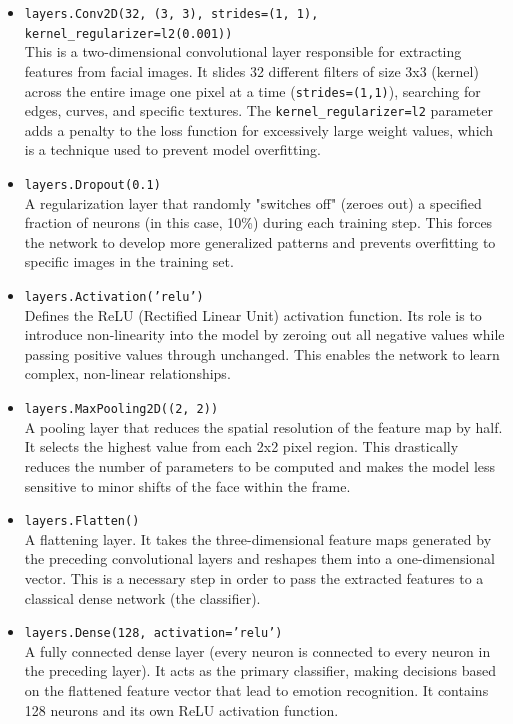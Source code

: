 \documentclass{article}
\begin{document}
\begin{itemize}
    \item \texttt{layers.Conv2D(32, (3, 3), strides=(1, 1), kernel\_regularizer=l2(0.001))} \\
    This is a two-dimensional convolutional layer responsible for extracting features from facial images. It slides 32 different filters of size 3x3 (kernel) across the entire image one pixel at a time (\texttt{strides=(1,1)}), searching for edges, curves, and specific textures. The \texttt{kernel\_regularizer=l2} parameter adds a penalty to the loss function for excessively large weight values, which is a technique used to prevent model overfitting.
    
    \item \texttt{layers.Dropout(0.1)} \\
    A regularization layer that randomly "switches off" (zeroes out) a specified fraction of neurons (in this case, 10\%) during each training step. This forces the network to develop more generalized patterns and prevents overfitting to specific images in the training set.
    
    \item \texttt{layers.Activation('relu')} \\
    Defines the ReLU (Rectified Linear Unit) activation function. Its role is to introduce non-linearity into the model by zeroing out all negative values while passing positive values through unchanged. This enables the network to learn complex, non-linear relationships.
    
    \item \texttt{layers.MaxPooling2D((2, 2))} \\
    A pooling layer that reduces the spatial resolution of the feature map by half. It selects the highest value from each 2x2 pixel region. This drastically reduces the number of parameters to be computed and makes the model less sensitive to minor shifts of the face within the frame.
    
    \item \texttt{layers.Flatten()} \\
    A flattening layer. It takes the three-dimensional feature maps generated by the preceding convolutional layers and reshapes them into a one-dimensional vector. This is a necessary step in order to pass the extracted features to a classical dense network (the classifier).
    
    \item \texttt{layers.Dense(128, activation='relu')} \\
    A fully connected dense layer (every neuron is connected to every neuron in the preceding layer). It acts as the primary classifier, making decisions based on the flattened feature vector that lead to emotion recognition. It contains 128 neurons and its own ReLU activation function.
    

\end{itemize}
\end{document}
